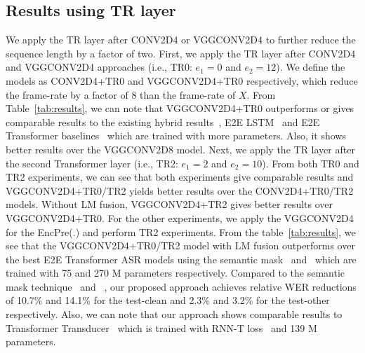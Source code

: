 \documentclass{article}
\begin{document}
\subsection{Results using TR layer}
We apply the TR layer after CONV2D4 or VGGCONV2D4 to further reduce the sequence length by a factor of two. 
First, we apply the TR layer after CONV2D4 and VGGCONV2D4 approaches (i.e., TR0: $e_1=0$ and $e_2=12$). We define the models as CONV2D4+TR0 and VGGCONV2D4+TR0 respectively, which reduce the frame-rate by a factor of 8 than the frame-rate of $X$.
From Table~\ref{tab:results}, 
we can note that VGGCONV2D4+TR0 outperforms or gives comparable results to the existing hybrid results~\citep{wang2020c,rwth}, E2E LSTM~\citep{specaugment} and E2E Transformer baselines~\citep{moritz2020,karita2019asru,e2e2020,wang2020a} which are trained with more parameters. Also, it shows better results over the VGGCONV2D8 model. 
Next, we apply the TR layer after the second Transformer layer (i.e., TR2: $e_1=2$ and $e_2=10$).  From both TR0 and TR2 experiments, we can see that both experiments give comparable results and VGGCONV2D4+TR0/TR2 yields better results over the CONV2D4+TR0/TR2 models. Without LM fusion, VGGCONV2D4+TR2 gives better results over VGGCONV2D4+TR0. 
For the other experiments, we apply the VGGCONV2D4 for the EncPre(.) and perform TR2 experiments.
From the table~\ref{tab:results}, we see that the VGGCONV2D4+TR0/TR2 model with LM fusion outperforms over the best E2E Transformer ASR models  using the semantic mask~\citep{wang2020a} and~\citep{e2e2020} which are  trained with 75 and 270 M parameters respectively. Compared to the semantic mask technique~\citep{wang2020a} and ~\citep{e2e2020}, our proposed approach achieves relative WER reductions of 10.7\% and 14.1\% for the test-clean and 2.3\% and 3.2\% for the test-other respectively. 
Also, we can note that our approach shows comparable results to Transformer Transducer~\citep{transducer} which is trained with RNN-T loss~\citep{rnnt-loss} and 139 M parameters. 
\end{document}
